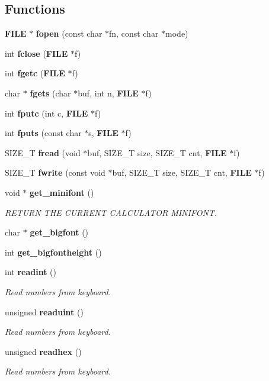 \subsection*{Functions}
\begin{CompactItemize}
\item 
{\bf FILE} $\ast$ {\bf fopen} (const char $\ast$fn, const char $\ast$mode)
\item 
int {\bf fclose} ({\bf FILE} $\ast$f)
\item 
int {\bf fgetc} ({\bf FILE} $\ast$f)
\item 
char $\ast$ {\bf fgets} (char $\ast$buf, int n, {\bf FILE} $\ast$f)
\item 
int {\bf fputc} (int c, {\bf FILE} $\ast$f)
\item 
int {\bf fputs} (const char $\ast$s, {\bf FILE} $\ast$f)
\item 
SIZE\_\-T {\bf fread} (void $\ast$buf, SIZE\_\-T size, SIZE\_\-T cnt, {\bf FILE} $\ast$f)
\item 
SIZE\_\-T {\bf fwrite} (const void $\ast$buf, SIZE\_\-T size, SIZE\_\-T cnt, {\bf FILE} $\ast$f)
\item 
void $\ast$ {\bf get\_\-minifont} ()
\begin{CompactList}\small\item\em RETURN THE CURRENT CALCULATOR MINIFONT.\item\end{CompactList}\item 
char $\ast$ {\bf get\_\-bigfont} ()
\item 
int {\bf get\_\-bigfontheight} ()
\item 
int {\bf readint} ()
\begin{CompactList}\small\item\em Read numbers from keyboard.\item\end{CompactList}\item 
unsigned {\bf readuint} ()
\begin{CompactList}\small\item\em Read numbers from keyboard.\item\end{CompactList}\item 
unsigned {\bf readhex} ()
\begin{CompactList}\small\item\em Read numbers from keyboard.\item\end{CompactList}\item 

\end{CompactItemize}

